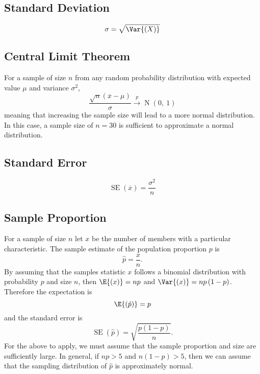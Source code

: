 \documentclass{article}
\begin{document}
\begin{multicols}{3}
        \subsection{Standard Deviation}
        \begin{equation*}
            \sigma = \sqrt{\Var{\left( X \right)}}
        \end{equation*}
        

\subsection{Central Limit Theorem}
For a sample of size \(n\) from any random probability distribution with expected value \(\mu\)
and variance \(\sigma^2\),
\begin{equation*}
    \frac{\sqrt{n}\left( \overline{x} - \mu \right)}{\sigma} \overset{p}{\rightarrow} \operatorname{N}{\left( 0,\: 1 \right)}
\end{equation*}
meaning that increasing the sample size will lead to a more normal distribution.
In this case, a sample size of \(n = 30\) is sufficient to approximate a normal distribution.
\subsection{Standard Error}
\begin{equation*}
    \operatorname{SE}{\left( \overline{x} \right)} = \frac{\sigma^2}{n}
\end{equation*}
\subsection{Sample Proportion}
For a sample of size \(n\) let \(x\) be the number of members with a particular characteristic.
The sample estimate of the population proportion \(p\) is
\begin{equation*}
    \hat{p} = \frac{x}{n}.
\end{equation*}
By assuming that the samples statistic \(x\) follows a binomial distribution with probability \(p\) and
size \(n\), then \(\E{\left( x \right)} = np\) and \(\Var{\left( x \right)} = np\left( 1 - p \right)\).
Therefore the expectation is
\begin{equation*}
    \E{\left( \hat{p} \right)} = p
\end{equation*}
and the standard error is
\begin{equation*}
    \operatorname{SE}{\left( \hat{p} \right)} = \sqrt{\frac{p\left( 1 - p \right)}{n}}.
\end{equation*}
For the above to apply, we must assume that the sample proportion and size are sufficiently large.
In general, if \(np > 5\) and \(n\left( 1 - p \right) > 5\), then we can assume that the sampling distribution of \(\hat{p}\)
is approximately normal.

\end{multicols}
\end{document}
